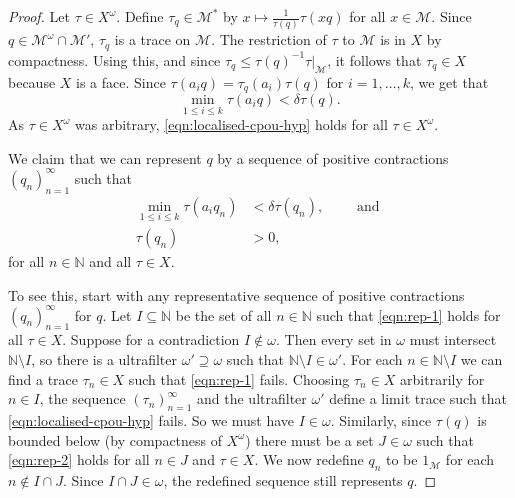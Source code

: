 \documentclass[a4paper,11pt]{amsart}
\theoremstyle{definition}
\numberwithin{equation}{section}
\numberwithin{theorem}{section}
\newcommand{\N}{\mathbb N}
\newcommand{\M}{\mathcal{M}}
\begin{document}
\begin{proof}
    Let $\tau \in X^\omega$.
    Define $\tau_q \in \M^*$ by $x \mapsto \tfrac{1}{\tau(q)}\tau(xq)$ for all $x \in \M$. 
    Since $q \in \M^\omega \cap \M'$, $\tau_q$ is a trace on $\M$. 
    The restriction of $\tau$ to $\M$ is in $X$ by compactness.
    Using this, and since $\tau_q \leq \tau(q)^{-1}\tau|_\M$, it follows that $\tau_q \in X$ because $X$ is a face.
    Since $\tau(a_iq) = \tau_q(a_i)\tau(q)$ for $i=1,\ldots,k$, we get that
    \begin{equation}
        \min_{1 \leq i \leq k} \tau(a_iq) < \delta \tau(q) \label{eqn:localised-cpou-hyp}.
    \end{equation}
    As $\tau \in X^\omega$ was arbitrary, \eqref{eqn:localised-cpou-hyp} holds for all $\tau \in X^\omega$.

    We claim that we can represent $q$ by a sequence of positive contractions $(q_n)_{n=1}^\infty$ such that
    \begin{align}
        \min_{1 \leq i \leq k} \tau(a_iq_n) &< \delta \tau(q_n), \quad \quad \mbox{ and }\label{eqn:rep-1}\\
        \tau(q_n) &> 0, \label{eqn:rep-2}
    \end{align}
    for all $n \in \N$ and all $\tau \in X$. 
    
    To see this, start with any representative sequence of positive contractions $(q_n)_{n=1}^\infty$ for $q$. 
    Let $I \subseteq \N$ be the set of all $n \in \N$ such that \eqref{eqn:rep-1} holds for all $\tau \in X$.
    Suppose for a contradiction $I \not\in \omega$. 
    Then every set in $\omega$ must intersect $\N \setminus I$, so there is a ultrafilter $\omega' \supseteq \omega$ such that $\N \setminus I \in \omega'$. 
    For each $n \in \N \setminus I$ we can find a trace $\tau_n \in X$ such that \eqref{eqn:rep-1} fails. Choosing $\tau_n \in X$ arbitrarily for $n\in I$, the sequence $(\tau_n)_{n=1}^\infty$ and the ultrafilter $\omega'$ define a limit trace such that \eqref{eqn:localised-cpou-hyp} fails. So we must have $I \in \omega$. Similarly, since $\tau(q)$ is bounded below (by compactness of $X^\omega$) there must be a set $J \in \omega$ such that \eqref{eqn:rep-2} holds for all $n \in J$ and $\tau \in X$. We now redefine $q_n$ to be $1_{\M}$ for each $n \not \in I \cap J$. Since $I \cap J \in \omega$, the redefined sequence still represents $q$.


\end{proof}
\end{document}
